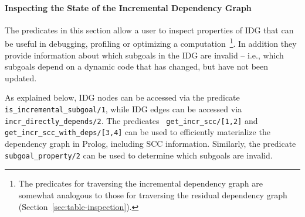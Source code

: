 \paragraph{Inspecting the State of the Incremental Dependency Graph}
%
The predicates in this section allow a user to inspect properties of
IDG that can be useful in debugging, profiling or optimizing a
computation~\footnote{The predicates for traversing the incremental
  dependency graph are somewhat analogous to those for traversing the
  residual dependency graph (Section~\ref{sec:table-inspection}).}.
In addition they provide information about which subgoals in the IDG
are invalid -- i.e., which subgoals depend on a dynamic code that has
changed, but have not been updated.

As explained below, IDG nodes can be accessed via the predicate {\tt
  is\_incremental\_subgoal/1}, while IDG edges can be accessed via
{\tt incr\_directly\_depends/2}.  The predicates {\tt
  get\_incr\_scc/[1,2]} and {\tt get\_incr\_scc\_with\_deps/[3,4]} can
be used to efficiently materialize the dependency graph in Prolog,
including SCC information.  Similarly, the predicate {\tt
  subgoal\_property/2} can be used to determine which subgoals are
invalid.

